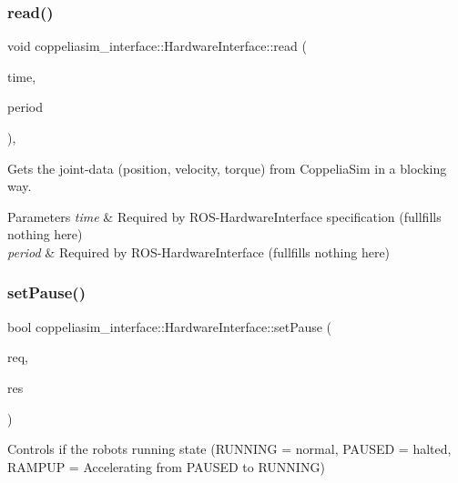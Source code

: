 \subsubsection{\texorpdfstring{read()}{read()}}
{\footnotesize\ttfamily void coppeliasim\+\_\+interface\+::\+Hardware\+Interface\+::read (\begin{DoxyParamCaption}\item[{const ros\+::\+Time \&}]{time,  }\item[{const ros\+::\+Duration \&}]{period }\end{DoxyParamCaption})\hspace{0.3cm}{\ttfamily [override]}, {\ttfamily [virtual]}}



Gets the joint-\/data (position, velocity, torque) from Coppelia\+Sim in a blocking way. 


\begin{DoxyParams}{Parameters}
{\em time} & Required by R\+O\+S-\/\+Hardware\+Interface specification (fullfills nothing here) \\
\hline
{\em period} & Required by R\+O\+S-\/\+Hardware\+Interface (fullfills nothing here) \\
\hline
\end{DoxyParams}
\mbox{\label{classcoppeliasim__interface_1_1HardwareInterface_a00cc87162beaecdf82c1510ae84b2d95}} 
\subsubsection{\texorpdfstring{set\+Pause()}{setPause()}}
{\footnotesize\ttfamily bool coppeliasim\+\_\+interface\+::\+Hardware\+Interface\+::set\+Pause (\begin{DoxyParamCaption}\item[{std\+\_\+srvs\+::\+Set\+Bool\+Request \&}]{req,  }\item[{std\+\_\+srvs\+::\+Set\+Bool\+Response \&}]{res }\end{DoxyParamCaption})}



Controls if the robots running state (R\+U\+N\+N\+I\+NG = normal, P\+A\+U\+S\+ED = halted, R\+A\+M\+P\+UP = Accelerating from P\+A\+U\+S\+ED to R\+U\+N\+N\+I\+NG) 


